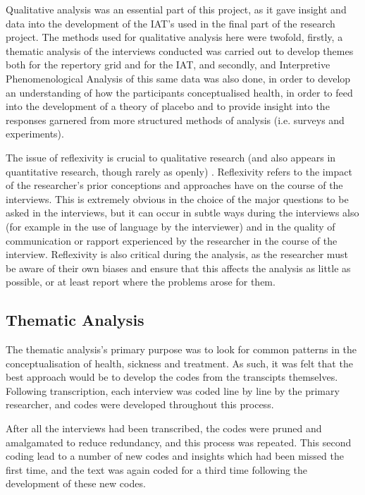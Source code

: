 Qualitative analysis was an essential part of this project, as it gave insight and data into the development of the IAT's used in the final part of the research project. The methods used for qualitative analysis here were twofold, firstly, a thematic analysis of the interviews conducted was carried out to develop themes both for the repertory grid and for the IAT, and secondly, and Interpretive Phenomenological Analysis of this same data was also done, in order to develop an understanding of how the participants conceptualised health, in order to feed into the development of a theory of placebo and to provide insight into the responses garnered from more structured methods of analysis (i.e. surveys and experiments). 

The issue of reflexivity is crucial to qualitative research (and also appears in quantitative research, though rarely as openly) \cite{rosenthal1967covert, rosenthal1969interpersonal}.
Reflexivity refers to the impact of the researcher's prior conceptions and approaches have on the course of the interviews. This is extremely obvious in the choice of the major questions to be asked in the interviews, but it can occur in subtle ways during the interviews also (for example in the use of language by the interviewer) and in the quality of communication or rapport experienced by the researcher in the course of the interview. Reflexivity is also critical during the analysis, as the researcher must be aware of their own biases and ensure that this affects the analysis as little as possible, or at least report where the problems arose for them.  

\subsection{Thematic Analysis}

The thematic analysis's primary purpose was to look for common patterns in the conceptualisation of health, sickness and treatment. As such, it was felt that the best approach would be to develop the codes from the transcipts themselves. Following transcription, each interview was coded line by line by the primary researcher, and codes were developed throughout this process. 

After all the interviews had been transcribed, the codes were pruned and amalgamated to reduce redundancy, and this process was repeated. This second coding lead to a number of new codes and insights which had been missed the first time, and the text was again coded for a third time following the development of these new codes. 

